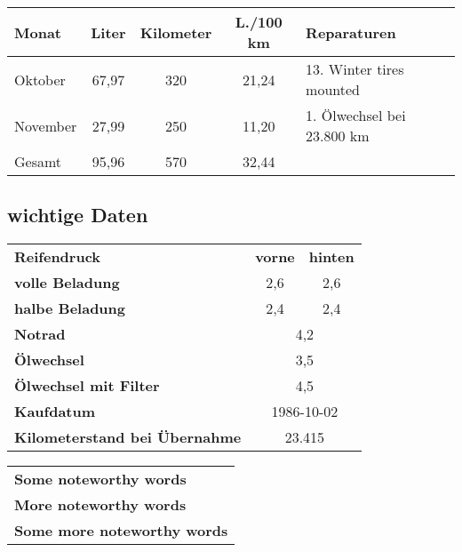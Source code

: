 \documentclass[11pt, a4paper]{article}
\begin{document}
\begin{tabular}{|l|c|c|c|l|}
\hline
Monat & Liter & Kilometer & L./100 km & Reparaturen \\
\hline
Oktober & 67,97 & 320 & 21,24 & 13. Winter tires mounted\\
November & 27,99 & 250 & 11,20 & 1. Ölwechsel bei 23.800 km\\
\hline
Gesamt & 95,96 & 570 & 32,44 & \\
\hline
\end{tabular}

\newpage

\subsection*{wichtige Daten}

\begin{tabular}{lcc}\textbf{Reifendruck} & \textbf{vorne} & \textbf{hinten} \\
\textbf{volle Beladung} & 2,6 & 2,6 \\
\textbf{halbe Beladung} & 2,4 & 2,4 \\
\textbf{Notrad} & \multicolumn{2}{c}{4,2} \\
\textbf{Ölwechsel} & \multicolumn{2}{c}{3,5} \\
\textbf{Ölwechsel mit Filter} & \multicolumn{2}{c}{4,5} \\
\textbf{Kaufdatum} & \multicolumn{2}{c}{1986-10-02} \\
\textbf{Kilometerstand bei Übernahme} & \multicolumn{2}{c}{23.415} \\
\end{tabular}

\begin{tabular}{l}
\textbf{Some noteworthy words} \\
\textbf{More noteworthy words} \\
\textbf{Some more noteworthy words} \\
\end{tabular}

\ifpdf
{}
\else
{}
\fi
\end{document}
